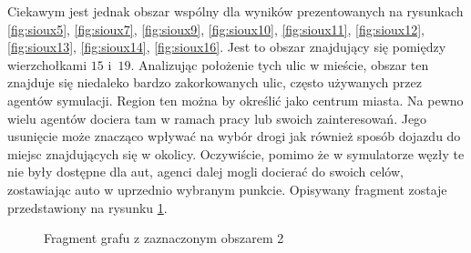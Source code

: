 \documentclass[twoside,12pt]{report}
\begin{document}
Ciekawym jest jednak obszar wspólny dla wyników prezentowanych na rysunkach \ref{fig:sioux5}, \ref{fig:sioux7}, \ref{fig:sioux9}, \ref{fig:sioux10}, \ref{fig:sioux11}, \ref{fig:sioux12}, \ref{fig:sioux13}, \ref{fig:sioux14}, \ref{fig:sioux16}. Jest to obszar znajdujący się pomiędzy wierzchołkami $15$ i~$19$. Analizując położenie tych ulic w mieście, obszar ten znajduje się niedaleko bardzo zakorkowanych ulic, często używanych przez agentów symulacji. Region ten można by określić jako centrum miasta. Na pewno wielu agentów dociera tam w ramach pracy lub swoich zainteresowań. Jego usunięcie może znacząco wpływać na wybór drogi jak również sposób dojazdu do miejsc znajdujących się w okolicy. Oczywiście, pomimo że w symulatorze węzły te nie były dostępne dla aut, agenci dalej mogli docierać do swoich celów, zostawiając auto w uprzednio wybranym punkcie. Opisywany fragment zostaje przedstawiony na rysunku \ref{fig:frag_2}.

\begin{figure}[htbp]
\centering
{}
\caption{Fragment grafu z zaznaczonym obszarem 2}
\label{fig:frag_2}
\end{figure}
\end{document}
